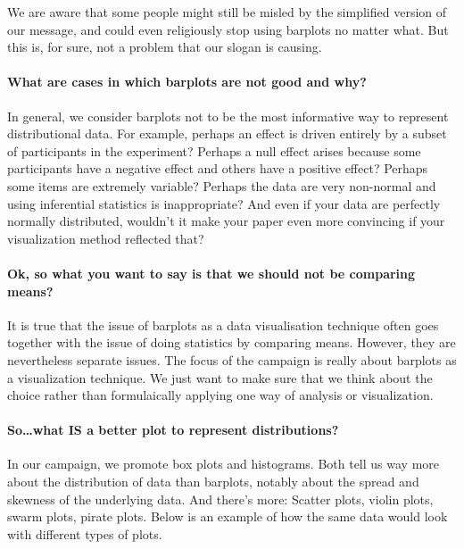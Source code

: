 \documentclass[english,floatsintext,man]{apa6}
\begin{document}
We are aware that some people might still be misled by the simplified
version of our message, and could even religiously stop using barplots
no matter what. But this is, for sure, not a problem that our slogan is
causing.

\paragraph{What are cases in which barplots are not good and
why?}\label{what-are-cases-in-which-barplots-are-not-good-and-why}

In general, we consider barplots not to be the most informative way to
represent distributional data. For example, perhaps an effect is driven
entirely by a subset of participants in the experiment? Perhaps a null
effect arises because some participants have a negative effect and
others have a positive effect? Perhaps some items are extremely
variable? Perhaps the data are very non-normal and using inferential
statistics is inappropriate? And even if your data are perfectly
normally distributed, wouldn't it make your paper even more convincing
if your visualization method reflected that?

\paragraph{Ok, so what you want to say is that we should not be
comparing
means?}\label{ok-so-what-you-want-to-say-is-that-we-should-not-be-comparing-means}

It is true that the issue of barplots as a data visualisation technique
often goes together with the issue of doing statistics by comparing
means. However, they are nevertheless separate issues. The focus of the
campaign is really about barplots as a visualization technique. We just
want to make sure that we think about the choice rather than
formulaically applying one way of analysis or visualization.

\paragraph{So\ldots{}what IS a better plot to represent
distributions?}\label{sowhat-is-a-better-plot-to-represent-distributions}

In our campaign, we promote box plots and histograms. Both tell us way
more about the distribution of data than barplots, notably about the
spread and skewness of the underlying data. And there's more: Scatter
plots, violin plots, swarm plots, pirate plots. Below is an example of
how the same data would look with different types of plots.
\end{document}
